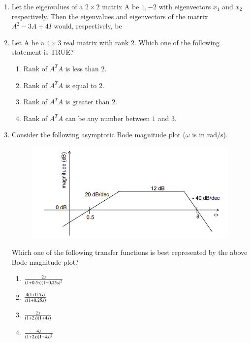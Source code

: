 \documentclass[journal,12pt,onecolumn]{IEEEtran}
\theoremstyle{remark}
\begin{document}
\begin{enumerate}[start=1, label=Q.\arabic*]
    \item Let the eigenvalues of a $2 \times 2$ matrix A be $1, -2$ with eigenvectors $x_{1}$ and $x_{2}$ respectively. Then the eigenvalues and eigenvectors of the matrix $A^{2}-3A+4I$ would, respectively, be
    \begin{enumerate}
    \end{enumerate}

    \hfill{}

    \item Let A be a $4 \times 3$ real matrix with rank $2$. Which one of the following statement is TRUE?
    \begin{enumerate}
        \item Rank of $A^T A$ is less than $2$.
        \item Rank of $A^T A$ is equal to $2$.
        \item Rank of $A^T A$ is greater than $2$.
        \item Rank of $A^T A$ can be any number between $1$ and $3$.
    \end{enumerate}

    \hfill{}

    \item Consider the following asymptotic Bode magnitude plot ({$\omega$ is in rad/s}).
    \begin{figure}[H]
        \includegraphics[width=0.7\columnwidth]{Figures/q30.png}
        \centering
        \caption{}
    \end{figure}
    Which one of the following transfer functions is best represented by the above Bode magnitude plot?
    \begin{enumerate}
            \item $\frac{2s}{\left(1+0.5s\right)\left(1+0.25s\right)^{2}}$
            \item $\frac{4\left(1+0.5s\right)}{s\left(1+0.25s\right)}$
            \item $\frac{2s}{\left(1+2s\right)\left(1+4s\right)}$
            \item $\frac{4s}{\left(1+2s\right)\left(1+4s\right)^{2}}$    \end{enumerate}


\end{enumerate}
\end{document}
